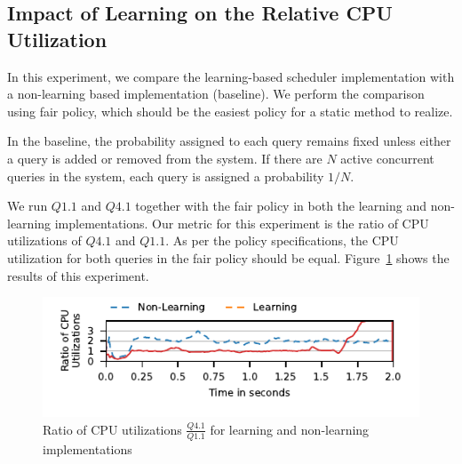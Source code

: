 \subsection{Impact of Learning on the Relative CPU Utilization}\label{ssec:learning-impact-cpu-util}
In this experiment, we compare the learning-based scheduler implementation with a 
non-learning based implementation (baseline).
We perform the comparison using fair policy, which should be the easiest policy for a static method to realize.

In the baseline, the probability assigned to each query remains fixed unless either a query is added or removed from the system.
If there are $N$ active concurrent queries in the system, each query is assigned a probability $1/N$.

We run $Q1.1$ and $Q4.1$ together with the fair policy in both the learning and 
non-learning implementations.
Our metric for this experiment is the ratio of CPU utilizations of $Q4.1$ and $Q1.1$.
As per the policy specifications, the CPU utilization for both queries in the fair policy 
should be equal. %
Figure~\ref{fig:non-learning-comparison} shows the results of this experiment.

\begin{figure}[t]
	\centering
	\includegraphics[width=\columnwidth]{figures/q1-q11-ratio-cpu-util.pdf}
	\vspace{-2em}
	\caption{Ratio of CPU utilizations  $\frac{Q4.1}{Q1.1}$ for learning and non-learning 
		implementations}
	\label{fig:non-learning-comparison}
	\vspace{-1.5em}
\end{figure}


